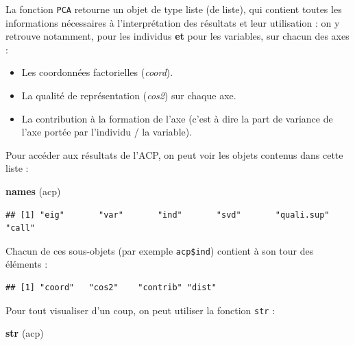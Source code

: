 \documentclass[]{book}
\newenvironment{Shaded}{\begin{snugshade}}{\end{snugshade}}
\newcommand{\KeywordTok}[1]{\textcolor[rgb]{0.13,0.29,0.53}{\textbf{#1}}}
\newcommand{\NormalTok}[1]{#1}
\newcommand{\OperatorTok}[1]{\textcolor[rgb]{0.81,0.36,0.00}{\textbf{#1}}}
\providecommand{\tightlist}{%
  \setlength{\itemsep}{0pt}\setlength{\parskip}{0pt}}
\begin{document}
La fonction \texttt{PCA} retourne un objet de type liste (de liste), qui contient toutes les informations nécessaires à l'interprétation des résultats et leur utilisation : on y retrouve notamment, pour les individus \textbf{et} pour les variables, sur chacun des axes :

\begin{itemize}
\tightlist
\item
  Les coordonnées factorielles (\emph{coord}).
\item
  La qualité de représentation (\emph{cos2}) sur chaque axe.
\item
  La contribution à la formation de l'axe (c'est à dire la part de variance de l'axe portée par l'individu / la variable).
\end{itemize}

Pour accéder aux résultats de l'ACP, on peut voir les objets contenus dans cette liste :

\begin{Shaded}
\begin{Highlighting}[]
\KeywordTok{names}\NormalTok{ (acp)}
\end{Highlighting}
\end{Shaded}

\begin{verbatim}
## [1] "eig"       "var"       "ind"       "svd"       "quali.sup" "call"
\end{verbatim}

Chacun de ces sous-objets (par exemple \texttt{acp\$ind}) contient à son tour des éléments :

\begin{Shaded}
\end{Shaded}

\begin{verbatim}
## [1] "coord"   "cos2"    "contrib" "dist"
\end{verbatim}

Pour tout visualiser d'un coup, on peut utiliser la fonction \texttt{str} :

\begin{Shaded}
\begin{Highlighting}[]
\KeywordTok{str}\NormalTok{ (acp)}
\end{Highlighting}
\end{Shaded}
\end{document}
